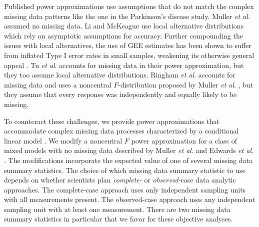 \documentclass[11pt]{article}
\begin{document}
Published power approximations use assumptions that do not match the complex missing data patterns like the one in the Parkinson's disease study. Muller \textit{et al}. \cite{muller_power_1992, muller_statistical_2007} assumed no missing data. Li and  McKeague \cite{li_power_2013} use local alternative distributions which rely on asymptotic assumptions for accuracy. Further compounding the issues with local alternatives, the use of GEE estimates has been shown to suffer from inflated Type I error rates in small samples, weakening its otherwise general appeal \cite{stiger_anova_1998}. Tu \textit{et al}. \cite{tu_power_2007} accounts for missing data in their power approximation, but they too assume local alternative distributions. Ringham \textit{et al}. \cite{ringham_multivariate_2016} accounts for missing data and uses a noncentral $F$-distribution proposed by Muller \textit{et al}. \cite{muller_power_1992, muller_statistical_2007}, but they assume that every response was independently and equally likely to be missing. 

To counteract these challenges, we provide power approximations that accommodate complex missing data processes characterized by a conditional linear model \cite{qaqish_family_2003}. We modify a noncentral $F$ power approximation for a class of mixed models with no missing data described by Muller \textit{et al}. \cite{muller_power_1992, muller_statistical_2007} and Edwards \textit{et al}. \cite{edwards_r2_2008}. The modifications incorporate the expected value of one of several missing data summary statistics. \cite{ringham_multivariate_2016, barton_hypothesis_1989, catellier_tests_2000} The choice of which missing data summary statistic to use depends on whether scientists plan \textit{complete-} or \textit{observed-}case data analytic approaches. The complete-case approach uses only independent sampling units with all measurements present. The observed-case approach uses any independent sampling unit with at least one measurement. There are two missing data summary statistics in particular that we favor for these objective analyses. 
\end{document}
